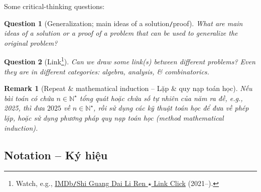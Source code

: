 \documentclass{article}
\newtheorem{question}{Question}
\newtheorem{remark}{Remark}
\begin{document}
Some critical-thinking questions:
\begin{question}[Generalization; main ideas of a solution{\tt/}proof]
	What are main ideas of a solution or a proof of a problem that can be used to generalize the original problem?
\end{question}

\begin{question}[Link\footnote{Watch, e.g., \href{https://www.imdb.com/title/tt14976292/}{IMDb{\tt/}Shi Guang Dai Li Ren $\star$ Link Click} (2021--).}]
	Can we draw some link(s) between different problems? Even they are in different categories: algebra, analysis, \& combinatorics.
\end{question}

\begin{remark}[Repeat \& mathematical induction -- Lặp \& quy nạp toán học]
	\label{rmk: repeat}
	Nếu bài toán có chứa $n\in\mathbb{N}^\star$ tổng quát hoặc chứa số tự nhiên của năm ra đề, e.g., 2025, thì đưa $2025$ về $n\in\mathbb{N}^\star$, rồi sử dụng các kỹ thuật toán học để đưa về phép lặp, hoặc sử dụng phương pháp quy nạp toán học (method mathematical induction).
\end{remark}



\subsection{Notation -- Ký hiệu}
\end{document}

